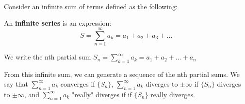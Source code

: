 \documentclass[../main.tex]{subfiles}
\begin{document}
    Consider an infinite sum of terms defined as the following:

    \begin{definition}
        An \textbf{infinite series} is an expression:
        \[ S = \sum_{n=1}^{\infty} a_k = a_1 + a_2 + a_3 + \dots \]

        We write the nth partial sum \( S_n = \sum_{k=1}^{\infty} a_k = a_1 + a_2 + \dots + a_n \)
    \end{definition}

    From this infinite sum, we can generate a sequence of the nth partial sums.
    We say that \( \sum_{n=1}^{\infty} a_k \) converges if \( \{S_n\} \),
    \( \sum_{n=1}^{\infty} a_k \) diverges to \( \pm \infty \) if \( \{S_n\} \) diverges to \( \pm \infty \),
    and \( \sum_{n=1}^{\infty} a_k \) "really" diverges if if \( \{S_n\} \) really diverges.
    
\end{document}
